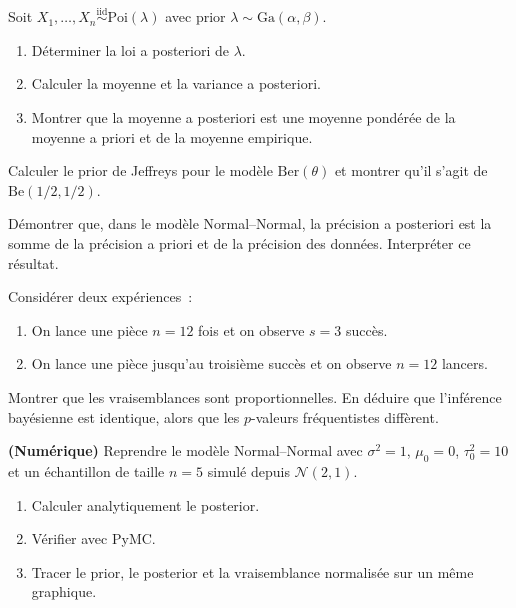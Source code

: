 \begin{exercice}
Soit $X_1, \ldots, X_n \overset{\text{iid}}{\sim} \text{Poi}(\lambda)$
avec prior $\lambda \sim \text{Ga}(\alpha, \beta)$.
\begin{enumerate}
  \item D\'eterminer la loi a posteriori de $\lambda$.
  \item Calculer la moyenne et la variance a posteriori.
  \item Montrer que la moyenne a posteriori est une moyenne
        pond\'er\'ee de la moyenne a priori et de la moyenne
        empirique.
\end{enumerate}
\end{exercice}

\begin{exercice}
Calculer le prior de Jeffreys pour le mod\`ele $\text{Ber}(\theta)$ et
montrer qu'il s'agit de $\text{Be}(1/2, 1/2)$.
\end{exercice}

\begin{exercice}
D\'emontrer que, dans le mod\`ele Normal--Normal, la pr\'ecision a
posteriori est la somme de la pr\'ecision a priori et de la pr\'ecision
des donn\'ees. Interpr\'eter ce r\'esultat.
\end{exercice}

\begin{exercice}
Consid\'erer deux exp\'eriences~:
\begin{enumerate}
  \item On lance une pi\`ece $n = 12$ fois et on observe $s = 3$ succ\`es.
  \item On lance une pi\`ece jusqu'au troisi\`eme succ\`es et on observe
        $n = 12$ lancers.
\end{enumerate}
Montrer que les vraisemblances sont proportionnelles. En d\'eduire que
l'inf\'erence bay\'esienne est identique, alors que les $p$-valeurs
fr\'equentistes diff\`erent.
\end{exercice}

\begin{exercice}
\textbf{(Num\'erique)} Reprendre le mod\`ele Normal--Normal avec
$\sigma^2 = 1$, $\mu_0 = 0$, $\tau_0^2 = 10$ et un \'echantillon de
taille $n = 5$ simul\'e depuis $\mathcal{N}(2, 1)$.
\begin{enumerate}
  \item Calculer analytiquement le posterior.
  \item V\'erifier avec PyMC.
  \item Tracer le prior, le posterior et la vraisemblance normalis\'ee
        sur un m\^eme graphique.
\end{enumerate}
\end{exercice}
